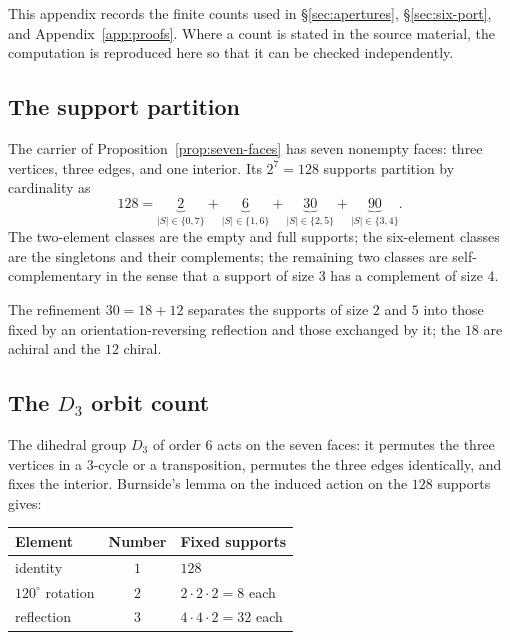 \label{app:six-port-counts-body}

This appendix records the finite counts used in \S\ref{sec:apertures},
\S\ref{sec:six-port}, and Appendix~\ref{app:proofs}.  Where a count is stated in the source
material, the computation is reproduced here so that it can be checked independently.

\subsection{The support partition}

The carrier of Proposition~\ref{prop:seven-faces} has seven nonempty faces: three vertices,
three edges, and one interior.  Its $2^{7}=128$ supports partition by cardinality as
\[
  128=\underbrace{2}_{|S|\in\{0,7\}}+\underbrace{6}_{|S|\in\{1,6\}}
  +\underbrace{30}_{|S|\in\{2,5\}}+\underbrace{90}_{|S|\in\{3,4\}} .
\]
The two-element classes are the empty and full supports; the six-element classes are the
singletons and their complements; the remaining two classes are self-complementary in the
sense that a support of size $3$ has a complement of size $4$.

The refinement $30=18+12$ separates the supports of size $2$ and $5$ into those fixed by an
orientation-reversing reflection and those exchanged by it; the $18$ are achiral and the $12$
chiral.

\subsection{The $D_3$ orbit count}

The dihedral group $D_3$ of order $6$ acts on the seven faces: it permutes the three vertices
in a $3$-cycle or a transposition, permutes the three edges identically, and fixes the
interior.  Burnside's lemma on the induced action on the $128$ supports gives:

\begin{center}
\begin{tabular}{@{}lcl@{}}
\toprule
Element & Number & Fixed supports \\
\midrule
identity & $1$ & $128$ \\
$120^\circ$ rotation & $2$ & $2\cdot2\cdot2=8$ each \\
reflection & $3$ & $4\cdot4\cdot2=32$ each \\
\bottomrule
\end{tabular}
\end{center}

